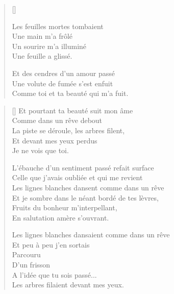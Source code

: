 \newpage

\settowidth{\versewidth}{Comme toi et ta beauté qui m'a fuit.}
\begin{verse}[\versewidth]
\begin{patverse}
Les feuilles mortes tombaient \\
Une main m'a frôlé \\
Un sourire m'a illuminé \\
Une feuille a glissé.

Et des cendres d'un amour passé \\
Une volute de fumée s'est enfuit \\
Comme toi et ta beauté qui m'a fuit.
\end{patverse}
\end{verse}


\settowidth{\versewidth}{Les lignes blanches dansaient comme dans un rêve}
\begin{verse}[\versewidth]
Et pourtant ta beauté suit mon âme \\
Comme dans un rêve debout \\
La piste se déroule, les arbres filent, \\
Et devant mes yeux perdus \\
Je ne vois que toi.

L'ébauche d'un sentiment passé refait surface \\
Celle que j'avais oubliée et qui me revient \\
Les lignes blanches dansent comme dans un rêve \\
Et je sombre dans le néant bordé de tes lèvres, \\
Fruits du bonheur m'interpellant, \\
En salutation amère s'ouvrant.

Les lignes blanches dansaient comme dans un rêve \\
Et peu à peu j'en sortais \\
Parcouru \\
D'un frisson \\
A l'idée que tu sois passé... \\
Les arbres filaient devant mes yeux.
\end{verse}


